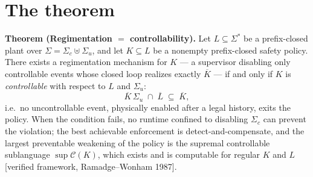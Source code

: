 \documentclass[11pt,a4paper]{article}  \usepackage{mdframed} \usepackage{graphicx}
\begin{document}
\section{The theorem}\label{sec:theorem} \begin{thebox} \textbf{Theorem (Regimentation $=$ controllability).} Let
$L\subseteq\Sigma^*$ be a prefix-closed plant over $\Sigma=\Sigma_c\uplus\Sigma_u$, and let $K\subseteq L$ be a nonempty
prefix-closed safety policy. There exists a regimentation mechanism for $K$ --- a supervisor disabling only controllable
events whose closed loop realizes exactly $\overline{K}$ --- if and only if $K$ is \emph{controllable} with respect to $L$
and $\Sigma_u$: \[ \overline{K}\,\Sigma_u\;\cap\;\overline{L}\;\subseteq\;\overline{K}, \] i.e.\ no uncontrollable event,
physically enabled after a legal history, exits the policy. When the condition fails, no runtime confined to disabling
$\Sigma_c$ can prevent the violation; the best achievable enforcement is detect-and-compensate, and the largest preventable
weakening of the policy is the supremal controllable sublanguage $\sup\mathcal{C}(K)$, which exists and is computable for
regular $K$ and $L$ [verified framework, Ramadge--Wonham 1987]. \end{thebox}
\end{document}
